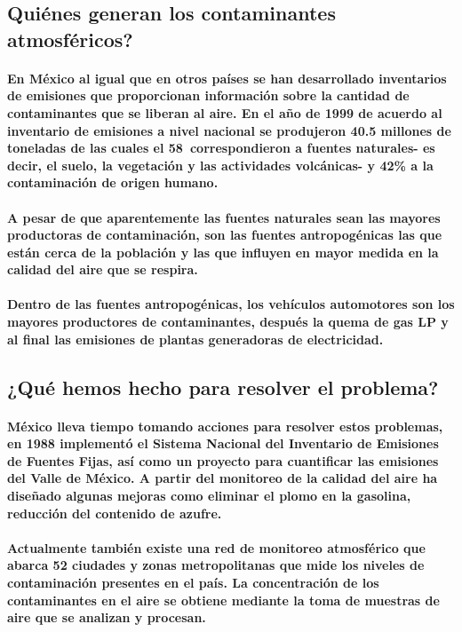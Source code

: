 \subsection {Quiénes generan los contaminantes atmosféricos?}
\paragraph {En México al igual que  en otros países se han desarrollado inventarios de emisiones que proporcionan información sobre la cantidad de contaminantes que se liberan al aire. En el año de 1999 de acuerdo al inventario de emisiones a nivel nacional se produjeron 40.5 millones de toneladas de las cuales el 58\ correspondieron a fuentes naturales- es decir, el suelo, la vegetación y las actividades volcánicas-    y 42\% a la contaminación de origen humano.}
\paragraph {A pesar de que aparentemente las fuentes naturales sean las mayores productoras de contaminación, son las fuentes antropogénicas las que están cerca de la población y las que influyen en mayor medida en la calidad del aire que se respira.}
\paragraph {Dentro de las fuentes antropogénicas, los vehículos automotores son los mayores productores de contaminantes, después la quema de gas LP y al final las emisiones de plantas generadoras de  electricidad.}
\subsection {¿Qué hemos hecho para resolver el problema?}
\paragraph {México lleva tiempo tomando acciones para resolver estos problemas, en 1988 implementó el Sistema Nacional del Inventario de Emisiones de Fuentes Fijas, así como un proyecto para cuantificar las emisiones del Valle de México. A partir del monitoreo de la calidad del aire ha diseñado algunas mejoras como eliminar el plomo en la gasolina, reducción del contenido de azufre.}
\paragraph {Actualmente también existe una red de monitoreo atmosférico que abarca 52 ciudades y zonas metropolitanas que mide los niveles de contaminación presentes en el país. La concentración de los contaminantes en el aire se obtiene mediante la toma de muestras de aire que se analizan y procesan.}
